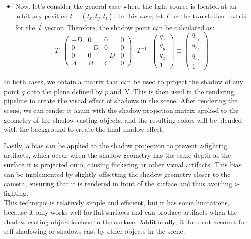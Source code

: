 \begin{itemize}
    \item Now, let's consider the general case where the light source is located at an arbitrary position $l=(l_x,l_y,l_z)$. In this case, let $T$ be the translation matrix for the $\vec{l}$ vector. Therefore, the shadow point can be calculated as:
    \begin{equation*}
        T\cdot \begin{pmatrix}
            -D & 0 & 0 & 0 \\
            0 & -D & 0 & 0 \\
            0 & 0 & -D & 0 \\
            A & B & C & 0
        \end{pmatrix}
        \cdot
        T^{-1}\cdot \begin{pmatrix}
            q_x \\
            q_y \\
            q_z \\
            1
        \end{pmatrix}
        \equiv 
        \begin{pmatrix}
            q_{s_x} \\
            q_{s_y} \\
            q_{s_z} \\
            1
        \end{pmatrix}
    \end{equation*}
\end{itemize}

In both cases, we obtain a matrix that can be used to project the shadow of any point $q$ onto the plane defined by $p$ and $N$. This is then used in the rendering pipeline to create the visual effect of shadows in the scene. After rendering the scene, we can render it again with the shadow projection matrix applied to the geometry of the shadow-casting objects, and the resulting colors will be blended with the background to create the final shadow effect.

Lastly, a bias can be applied to the shadow projection to prevent $z$-fighting artifacts, which occur when the shadow geometry has the same depth as the surface it is projected onto, causing flickering or other visual artifacts. This bias can be implemented by slightly offsetting the shadow geometry closer to the camera, ensuring that it is rendered in front of the surface and thus avoiding $z$-fighting.\\

This technique is relatively simple and efficient, but it has some limitations, because it only works well for flat surfaces and can produce artifacts when the shadow-casting object is close to the surface. Additionally, it does not account for self-shadowing or shadows cast by other objects in the scene.

